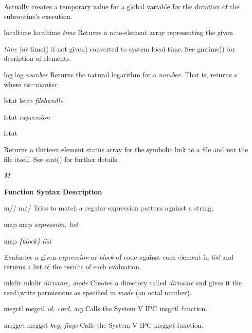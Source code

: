 \documentclass[a4paper,11pt]{book}
\begin{document}
\noindent Actually creates a temporary value for a global variable for the duration of the subroutine's execution.

\noindent localtime localtime \textit{time }Returns a nine-element array representing the given

\noindent \textit{time }(or time() if not given) converted to system local time. See gmtime() for desription of elements.

\noindent log log \textit{number }Returns the natural logarithm for a \textit{number}. That is, returns \textit{x }where e\textit{x}=\textit{number.}

\noindent 

\noindent lstat lstat \textit{filehandle}

\noindent 

\noindent lstat \textit{expression}

\noindent lstat

\noindent 

\noindent Returns a thirteen element status array for the symbolic link to a file and not the file itself. See stat() for further details.

\noindent 

\noindent \textit{M}

\noindent 

\noindent \textbf{Function Syntax Description}

\noindent 

\noindent m// m// Tries to match a regular expression pattern against a string.

\noindent map map \textit{expression, list}

\noindent 

\noindent map \textit{\{block\} list}

\noindent 

\noindent Evaluates a given \textit{expression }or \textit{block }of code against each element in \textit{list }and returns a list of the results of each evaluation.

\noindent mkdir mkdir \textit{dirname, mode }Creates a directory called \textit{dirname }and gives it the read\textbackslash write permissions as specified in \textit{mode }(an octal number).

\noindent msgctl msgctl \textit{id, cmd, arg }Calls the System V IPC msgctl function.

\noindent msgget msgget \textit{key, flags }Calls the System V IPC msgget function.

\noindent 
\end{document}
